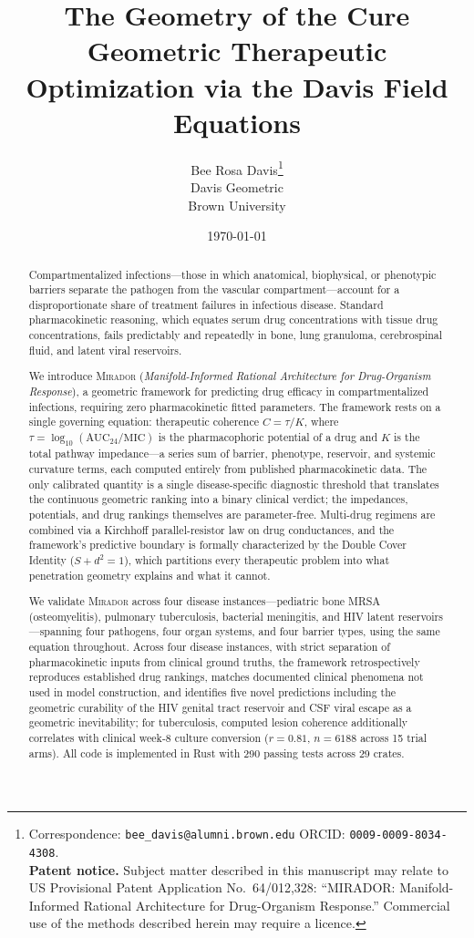 \documentclass[11pt]{article}
\title{\textbf{The Geometry of the Cure}\\[6pt]
\large Geometric Therapeutic Optimization via the Davis Field Equations}
\author{Bee Rosa Davis\thanks{%
  Correspondence: \texttt{bee\_davis@alumni.brown.edu}\quad
  ORCID: \texttt{0009-0009-8034-4308}.\\[2pt]
  \textbf{Patent notice.}
  Subject matter described in this manuscript may relate to
  US Provisional Patent Application No.\ 64/012,328:
  ``MIRADOR: Manifold-Informed Rational Architecture for Drug-Organism Response.''
  Commercial use of the methods described herein may require a licence.
}\\[4pt]
\small Davis Geometric\\
\small Brown University}
\date{\today}
\theoremstyle{plain}
\theoremstyle{definition}
\newcommand{\mirador}{\textsc{Mirador}}
\newcommand{\AUCday}{\mathrm{AUC}_{24}}
\newcommand{\MICval}{\mathrm{MIC}}
\begin{document}
\maketitle

\begin{abstract}
Compartmentalized infections---those in which anatomical, biophysical,
or phenotypic barriers separate the pathogen from the vascular compartment---account
for a disproportionate share of treatment failures in infectious disease.
Standard pharmacokinetic reasoning, which equates serum drug concentrations
with tissue drug concentrations, fails predictably and repeatedly in bone,
lung granuloma, cerebrospinal fluid, and latent viral reservoirs.

We introduce \mirador{} (\emph{Manifold-Informed Rational Architecture for
Drug-Organism Response}), a geometric framework for predicting
drug efficacy in compartmentalized infections, requiring zero
pharmacokinetic fitted parameters. The framework rests on a
single governing equation: therapeutic coherence $C = \tau / K$, where
$\tau = \log_{10}(\AUCday / \MICval)$ is the pharmacophoric potential of a drug
and $K$ is the total pathway impedance---a series sum of barrier, phenotype,
reservoir, and systemic curvature terms, each computed entirely from published
pharmacokinetic data. The only calibrated quantity is a single
disease-specific diagnostic threshold that translates the continuous
geometric ranking into a binary clinical verdict; the impedances,
potentials, and drug rankings themselves are parameter-free. Multi-drug
regimens are combined via a Kirchhoff parallel-resistor law on drug
conductances, and the framework's predictive boundary is formally
characterized by the Double Cover Identity ($S + d^2 = 1$), which
partitions every therapeutic problem into what penetration geometry
explains and what it cannot.

We validate \mirador{} across four disease instances---pediatric bone MRSA
(osteomyelitis), pulmonary tuberculosis, bacterial meningitis, and HIV latent
reservoirs---spanning four pathogens, four organ systems, and four barrier
types, using the same equation throughout. Across four disease instances, with strict separation of pharmacokinetic
inputs from clinical ground truths, the framework retrospectively reproduces
established drug rankings, matches documented clinical phenomena not used in
model construction, and identifies five novel predictions including the
geometric curability of the HIV genital tract reservoir and CSF viral escape
as a geometric inevitability; for tuberculosis, computed lesion coherence
additionally correlates with clinical week-8 culture conversion
($r = 0.81$, $n = 6188$ across 15 trial arms). All code is
implemented in Rust with 290 passing tests across 29 crates.
\end{abstract}
\end{document}
